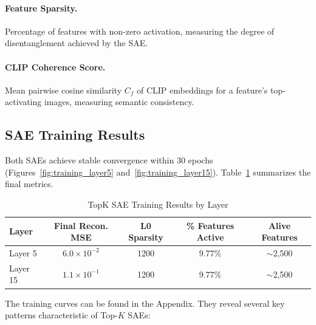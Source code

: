 \documentclass{article}
\begin{document}
\paragraph{Feature Sparsity.}
Percentage of features with non-zero activation, measuring the degree of disentanglement achieved by the SAE.

\paragraph{CLIP Coherence Score.}
Mean pairwise cosine similarity $C_f$ of CLIP embeddings for a feature's top-activating images, measuring semantic consistency.

\subsection{SAE Training Results}

Both SAEs achieve stable convergence within 30 epochs (Figures~\ref{fig:training_layer5} and~\ref{fig:training_layer15}). Table~\ref{tab:sae_results} summarizes the final metrics.

\begin{table}[ht]
\centering
\caption{TopK SAE Training Results by Layer}
\label{tab:sae_results}
\begin{tabular}{lcccc}
\toprule
\textbf{Layer} & \textbf{Final Recon. MSE} & \textbf{L0 Sparsity} & \textbf{\% Features Active} & \textbf{Alive Features} \\
\midrule
Layer 5 & $6.0 \times 10^{-2}$ & 1200 & 9.77\% & $\sim$2,500 \\
Layer 15 & $1.1 \times 10^{-1}$ & 1200 & 9.77\% & $\sim$2,500 \\
\bottomrule
\end{tabular}
\end{table}

The training curves can be found in the Appendix. They reveal several key patterns characteristic of Top-$K$ SAEs:
\end{document}
